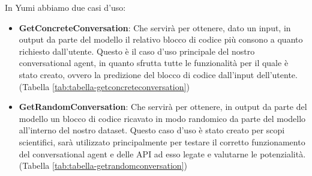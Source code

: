In Yumi abbiamo due casi d'uso:
\begin{itemize}
    \item \textbf{GetConcreteConversation}:  Che servirà per ottenere, dato un input, in output da parte del modello il relativo blocco di codice più consono a quanto richiesto dall'utente. Questo è il caso d'uso principale del nostro conversational agent, in quanto sfrutta tutte le funzionalità per il quale è stato creato, ovvero la predizione del blocco di codice dall'input dell'utente. (Tabella \ref{tab:tabella-getconcreteconversation})
    \item \textbf{GetRandomConversation}: Che servirà per ottenere, in output da parte del modello un blocco di codice ricavato in modo randomico da parte del modello all'interno del nostro dataset. Questo caso d'uso è stato creato per scopi scientifici, sarà utilizzato principalmente per testare il corretto funzionamento del conversational agent e delle API ad esso legate e valutarne le potenzialità.(Tabella \ref{tab:tabella-getrandomconversation})
\end{itemize}
